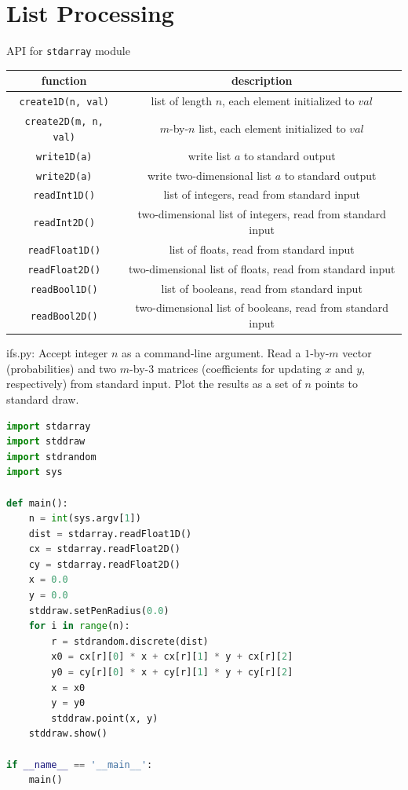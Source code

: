 \documentclass[8pt,a4paper,compress]{beamer}
\begin{document}
\section{List Processing}
\begin{frame}[fragile]
\pause

API for \lstinline{stdarray} module
\begin{center}
\begin{tabular}{cc}
function & description \\ \hline
\lstinline$create1D(n, val)$ & list of length $n$, each element initialized to $val$ \\
\lstinline$create2D(m, n, val)$ & $m$-by-$n$ list, each element initialized to $val$ \\
\lstinline$write1D(a)$ & write list $a$ to standard output \\
\lstinline$write2D(a)$ & write two-dimensional list $a$ to standard output \\
\lstinline$readInt1D()$ & list of integers, read from standard input \\
\lstinline$readInt2D()$ & two-dimensional list of integers, read from standard input \\
\lstinline$readFloat1D()$ & list of floats, read from standard input \\
\lstinline$readFloat2D()$ & two-dimensional list of floats, read from standard input \\
\lstinline$readBool1D()$ & list of booleans, read from standard input \\
\lstinline$readBool2D()$ & two-dimensional list of booleans, read from standard input
\end{tabular} 
\end{center}
\end{frame}

\begin{frame}[fragile]
\pause

\begin{framed}
\tiny ifs.py: Accept integer $n$ as a command-line argument. Read a $1$-by-$m$ vector (probabilities) and two $m$-by-$3$ matrices (coefficients for updating $x$ and $y$, respectively) from standard input. Plot the results as a set of $n$ points to standard draw.
\end{framed}

\begin{lstlisting}[language=Python,style=focusin]
import stdarray
import stddraw
import stdrandom
import sys

def main():
    n = int(sys.argv[1])
    dist = stdarray.readFloat1D()
    cx = stdarray.readFloat2D()
    cy = stdarray.readFloat2D()
    x = 0.0
    y = 0.0
    stddraw.setPenRadius(0.0)
    for i in range(n):
        r = stdrandom.discrete(dist)
        x0 = cx[r][0] * x + cx[r][1] * y + cx[r][2]
        y0 = cy[r][0] * x + cy[r][1] * y + cy[r][2]
        x = x0
        y = y0
        stddraw.point(x, y)
    stddraw.show()

if __name__ == '__main__':
    main()
\end{lstlisting}
\end{frame}
\end{document}

